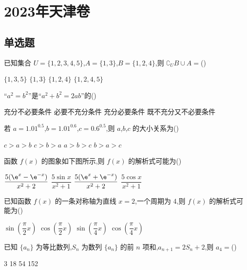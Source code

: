 \chapter{2023年天津卷}

\section{单选题}

\begin{problem}
已知集合 \(U=\{1,2,3,4,5\}\),\(A=\{1,3\}\),\(B=\{1,2,4\}\),则 \(\complement_U B\cup A=\)(\quad)

\choices
    {\(\{1,3,5\}\)}
    {\(\{1,3\}\)}
    {\(\{1,2,4\}\)}
    {\(\{1,2,4,5\}\)}
\end{problem}

\begin{problem}
``\(a^2=b^2\)''是``\(a^2+b^2=2ab\)''的(\quad)

\choices
    {充分不必要条件}
    {必要不充分条件}
    {充分必要条件}
    {既不充分又不必要条件}
\end{problem}

\begin{problem}
若 \(a=1.01^{0.5}\),\(b=1.01^{0.6}\),\(c=0.6^{0.5}\),则 \(a\),\(b\),\(c\) 的大小关系为(\quad)

\choices
    {\(c>a>b\)}
    {\(c>b>a\)}
    {\(a>b>c\)}
    {\(b>a>c\)}
\end{problem}

\begin{problem}
函数 \(f(x)\) 的图象如下图所示,则 \(f(x)\) 的解析式可能为(\quad)


\choices
    {\(\dfrac{5(\e^x-\e^{-x})}{x^2+2}\)}
    {\(\dfrac{5\sin x}{x^2+1}\)}
    {\(\dfrac{5(\e^x+\e^{-x})}{x^2+2}\)}
    {\(\dfrac{5\cos x}{x^2+1}\)}
\end{problem}

\begin{problem}
已知函数 \(f(x)\) 的一条对称轴为直线 \(x=2\),一个周期为 4,则 \(f(x)\) 的解析式可能为(\quad)

\choices
    {\(\sin \left( \dfrac{\pi}{2}x \right)\)}
    {\(\cos \left( \dfrac{\pi}{2}x \right)\)}
    {\(\sin \left( \dfrac{\pi}{4}x \right)\)}
    {\(\cos \left( \dfrac{\pi}{4}x \right)\)}
\end{problem}

\begin{problem}
已知 \(\{a_n\}\) 为等比数列,\(S_n\) 为数列 \(\{a_n\}\) 的前 \(n\) 项和,\(a_{n+1}=2S_n+2\),则 \(a_4=\)(\quad)

\choices
    {3}
    {18}
    {54}
    {152}
\end{problem}

